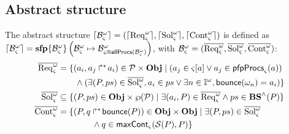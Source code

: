 \begin{comment}
Séquences de bonds abstraites :
$$\BS^\wedge(P) = \{ \zeta^\wedge \mid \zeta \in \BS(P), \nexists \zeta' \in \BS(P), \zeta'^\wedge \subsetneq \zeta^\wedge \}$$
where $\zeta^\wedge = (\zeta^\wedge_A, \zeta^\wedge_B, \zeta^\wedge_{max})$ with:
\begin{itemize}
  \item $\zeta^\wedge_A = \{ \PHhitter(\zeta_n) \mid n \in \indexes{\zeta} \wedge \PHsort(\PHhitter(\zeta_n)) \neq \PHsort(P) \}$ : ens. des requis d'autres sortes (frappeurs)
  \item $\zeta^\wedge_B = \{ \PHhitter(\zeta_n) \mid n \in \indexes{\zeta} \} \cup \{ \PHtarget(\zeta_n) \mid n \in \indexes{\zeta} \}$ : ens. des processus nécessaires (à ne pas perturber)
  \item $\zeta^\wedge_{max} = \max_{n \in \indexes{\zeta}}(\prio(\zeta_n))$ : plus faible priorité
\end{itemize}
\end{comment}

\subsection{Abstract structure}

The abstract structure $\lceil \mathcal{B}_\varsigma^\omega\rceil=(\lceil \mathrm{Req}^\omega_\varsigma\rceil,\lceil \mathrm{Sol}^\omega_\varsigma\rceil,\lceil \mathrm{Cont}^\omega_\varsigma\rceil)$ is defined as
$
 \lceil \mathcal{B}_\varsigma^\omega\rceil = \mathbf{sfp}\{\mathcal{B}^\omega_\varsigma\}\left(\mathcal{B}^\omega_\varsigma\mapsto\mathcal{B}^\omega_{\varsigma \Cap \mathsf{allProcs}(\mathcal{B}^\omega_\varsigma)}\right)
$,
with $\mathcal{B}^\omega_\varsigma=(\overline{\mathrm{Req}^\omega_\varsigma},\overline{\mathrm{Sol}^\omega_\varsigma},\overline{\mathrm{Cont}^\omega_\varsigma})$:
\begin{align*}
\overline{\mathrm{Req}^\omega_\varsigma} &= \{ (a_i,\mbox{${a}_{j}\Rsh^*\!{a}_{i}$}) \in \mathcal{P} \times \mathbf{Obj} \mid
  (a_j \in {\varsigma[a]} \vee a_j \in \mathsf{pfpProcs}_\varsigma(a)) \\
  & \qquad \wedge (\exists (P,ps) \in \overline{\mathrm{Sol}^\omega_\varsigma}, a_i \in ps \vee \exists n \in \mathbb{I}^{\omega}, \mathsf{bounce}(\omega_n)=a_i) \}
\\
\overline{\mathrm{Sol}^\omega_\varsigma} &\subseteq \{ (P,ps) \in \mathbf{Obj} \times \wp(\mathcal{P}) \mid
        \exists (a_i,P)\in \overline{\mathrm{Req}^\omega_\varsigma} \wedge ps \in \mathbf{BS}^\wedge(P) \}
\\
\overline{\mathrm{Cont}^\omega_\varsigma} & = \{ (P,\mbox{$q\Rsh^*\!\mathsf{bounce}(P)$}) \in \mathbf{Obj} \times \mathbf{Obj} \mid 
        \exists (P,ps)\in \overline{\mathrm{Sol}^\omega_\varsigma} \\
&\qquad\qquad
        \wedge q \in \mathsf{maxCont}_\varsigma(\mathcal{S}(P),P)\}
\end{align*}

